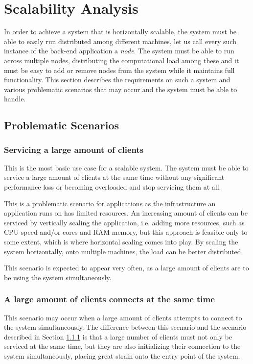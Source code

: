 \section{Scalability Analysis}
In order to achieve a system that is horizontally scalable, the system must be able to easily run distributed among different machines, let us call every such instance of the back-end application a \textit{node}. The system must be able to run across multiple nodes, distributing the computational load among these and it must be easy to add or remove nodes from the system while it maintains full functionality. This section describes the requirements on such a system and various problematic scenarios that may occur and the system must be able to handle.

\subsection{Problematic Scenarios} \label{analysis-scale}
\subsubsection{Servicing a large amount of clients} \label{analysis-scale-large-no}
This is the most basic use case for a scalable system. The system must be able to service a large amount of clients at the same time without any significant performance loss or becoming overloaded and stop servicing them at all.

This is a problematic scenario for applications as the infrastructure an application runs on has limited resources. An increasing amount of clients can be serviced by vertically scaling the application, i.e. adding more resources, such as CPU speed and/or cores and RAM memory, but this approach is feasible only to some extent, which is where horizontal scaling comes into play. By scaling the system horizontally, onto multiple machines, the load can be better distributed.

This scenario is expected to appear very often, as a large amount of clients are to be using the system simultaneously.

\subsubsection{A large amount of clients connects at the same time}
This scenario may occur when a large amount of clients attempts to connect to the system simultaneously. The difference between this scenario and the scenario described in Section \ref{analysis-scale-large-no}  is that a large number of clients must not only be serviced at the same time, but they are also initializing their connection to the system simultaneously, placing great strain onto the entry point of the system.

